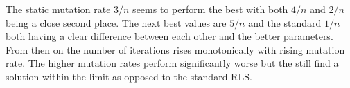 The static mutation rate $3/n$ seems to perform the best with both $4/n$ and $2/n$ being a close second place. The next best values are $5/n$ and the standard $1/n$ both having a clear difference between each other and the better parameters. From then on the number of iterations rises monotonically with rising mutation rate. The higher mutation rates perform significantly worse but the still find a solution within the limit as opposed to the standard RLS.
